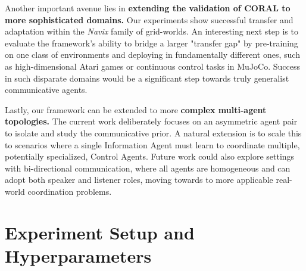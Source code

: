 \documentclass[letterpaper]{article} %
\begin{document}
\begin{appendix}
Another important avenue lies in \textbf{extending the validation of CORAL to more sophisticated domains.} Our experiments show successful transfer and adaptation within the \textit{Navix} family of grid-worlds. An interesting next step is to evaluate the framework's ability to bridge a larger "transfer gap" by pre-training on one class of environments and deploying in fundamentally different ones, such as high-dimensional Atari games or continuous control tasks in MuJoCo. Success in such disparate domains would be a significant step towards truly generalist communicative agents.


Lastly, our framework can be extended to more \textbf{complex multi-agent topologies.} The current work deliberately focuses on an asymmetric agent pair to isolate and study the communicative prior. A natural extension is to scale this to scenarios where a single Information Agent must learn to coordinate multiple, potentially specialized, Control Agents. Future work could also explore settings with bi-directional communication, where all agents are homogeneous and can adopt both speaker and listener roles, moving towards to more applicable real-world coordination problems.

\section{Experiment Setup and Hyperparameters}
\label{appendix:hyperparameters_and_setup}



\end{appendix}
\end{document}
